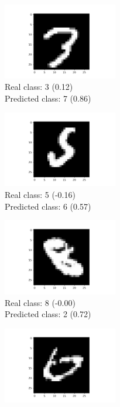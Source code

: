 \documentclass[a4paper]{article}    %
\begin{document}
\begin{figure}[H]
    \centering
    \begin{subfigure}{0.32\textwidth}
        \centering
        \includegraphics[width=5.0cm]{8}
        \caption{
            Real class: 3 (0.12)\\
            Predicted class: 7 (0.86)}
        \label{fig:example_1}
    \end{subfigure}
    \hfill
    \begin{subfigure}{0.32\textwidth}
        \centering
        \includegraphics[width=5.0cm]{9}
        \caption{
            Real class: 5 (-0.16)\\
            Predicted class: 6 (0.57)}
        \label{fig:example_2}
    \end{subfigure}
    \hfill
    \begin{subfigure}{0.32\textwidth}
        \centering
        \includegraphics[width=5.0cm]{10}
        \caption{
            Real class: 8 (-0.00)\\
            Predicted class: 2 (0.72)}
        \label{fig:example_3}
    \end{subfigure}
    \hfill
    \begin{subfigure}{0.32\textwidth}
        \centering
        \includegraphics[width=5.0cm]{12}

\end{subfigure}
\end{figure}
\end{document}
